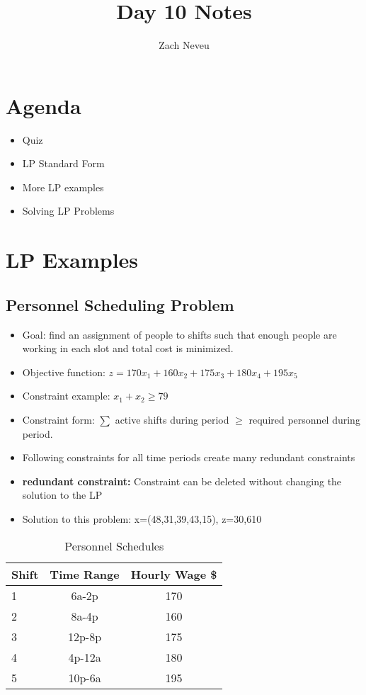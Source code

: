 \documentclass[12pt, letter]{article}
\author{Zach Neveu}
\title{ Day 10 Notes }
\begin{document}
\maketitle

\section{Agenda}%
\label{sec:agenda}
\begin{itemize}
	\item Quiz
	\item LP Standard Form
	\item More LP examples
	\item Solving LP Problems
\end{itemize}

\section{LP Examples}%
\label{sec:lp_examples}

\subsection*{Personnel Scheduling Problem}
\begin{itemize}
	\item Goal: find an assignment of people to shifts such that enough people are working in each slot and total cost is minimized.
	\item Objective function: $z = 170x_1+160x_2+175x_3+180x_4+195x_5$
	\item Constraint example: $x_1+x_2 \ge 79$
	\item Constraint form:  $\sum$ active shifts during period $\ge$ required personnel during period.
	\item Following constraints for all time periods create many redundant constraints
	\item \textbf{redundant constraint: } Constraint can be deleted without changing the solution to the LP
	\item Solution to this problem: x=(48,31,39,43,15), z=30,610
\end{itemize}
\begin{table}[h]
	\centering
	\caption{Personnel Schedules}
	\label{tab:schedule}
	\begin{tabular}{|l|c|c|}
	\hline
	Shift & Time Range & Hourly Wage \$\\
	\hline
	1 & 6a-2p  & 170 \\
	\hline
	2 & 8a-4p  & 160 \\
	\hline
	3 & 12p-8p & 175 \\
	\hline
	4 & 4p-12a & 180 \\
	\hline
	5 & 10p-6a & 195 \\
	\hline
	\end{tabular}
\end{table}
\end{document}
